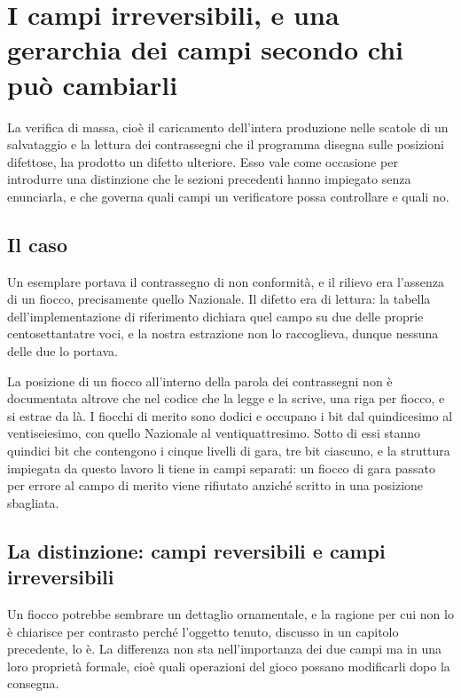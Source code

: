 \section{I campi irreversibili, e una gerarchia dei campi secondo chi può cambiarli}

La verifica di massa, cioè il caricamento dell'intera produzione nelle scatole di un salvataggio e la lettura dei contrassegni che il programma disegna sulle posizioni difettose, ha prodotto un difetto ulteriore. Esso vale come occasione per introdurre una distinzione che le sezioni precedenti hanno impiegato senza enunciarla, e che governa quali campi un verificatore possa controllare e quali no.

\subsection*{Il caso}

Un esemplare portava il contrassegno di non conformità, e il rilievo era l'assenza di un fiocco, precisamente quello Nazionale. Il difetto era di lettura: la tabella dell'implementazione di riferimento dichiara quel campo su due delle proprie centosettantatre voci, e la nostra estrazione non lo raccoglieva, dunque nessuna delle due lo portava.

La posizione di un fiocco all'interno della parola dei contrassegni non è documentata altrove che nel codice che la legge e la scrive, una riga per fiocco, e si estrae da là. I fiocchi di merito sono dodici e occupano i bit dal quindicesimo al ventiseiesimo, con quello Nazionale al ventiquattresimo. Sotto di essi stanno quindici bit che contengono i cinque livelli di gara, tre bit ciascuno, e la struttura impiegata da questo lavoro li tiene in campi separati: un fiocco di gara passato per errore al campo di merito viene rifiutato anziché scritto in una posizione sbagliata.

\subsection*{La distinzione: campi reversibili e campi irreversibili}

Un fiocco potrebbe sembrare un dettaglio ornamentale, e la ragione per cui non lo è chiarisce per contrasto perché l'oggetto tenuto, discusso in un capitolo precedente, lo è. La differenza non sta nell'importanza dei due campi ma in una loro proprietà formale, cioè quali operazioni del gioco possano modificarli dopo la consegna.

